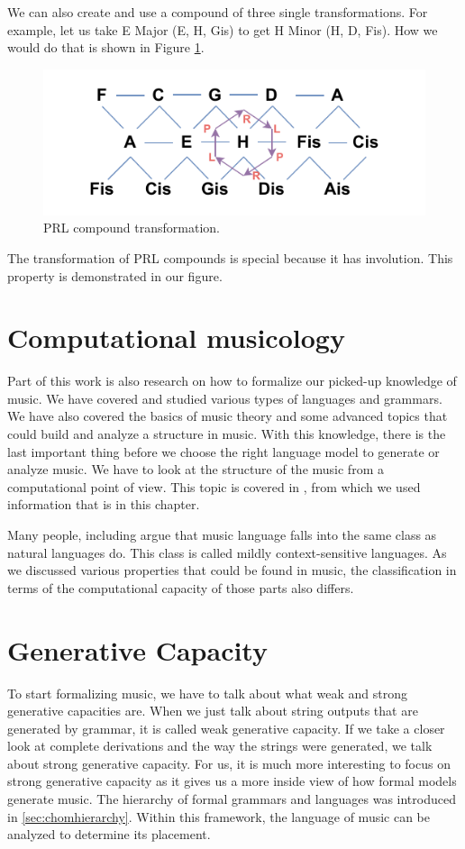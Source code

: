 We can also create and use a compound of three single transformations. For example, let us take E Major (E, H, Gis) to get H Minor (H, D, Fis). How we would do that is shown in Figure \ref{fig:tonnetzPRL}.

\begin{figure}[H]
    \centering
    \includegraphics[scale=0.9]{obrazky-figures/tonnetzPRL.pdf}
    \caption{PRL compound transformation.}
    \label{fig:tonnetzPRL}
\end{figure}

The transformation of PRL compounds is special because it has involution. This property is demonstrated in our figure.

\section{Computational musicology}
Part of this work is also research on how to formalize our picked-up knowledge of music. We have covered and studied various types of languages and grammars. We have also covered the basics of music theory and some advanced topics that could build and analyze a structure in music. With this knowledge, there is the last important thing before we choose the right language model to generate or analyze music. We have to look at the structure of the music from a computational point of view. This topic is covered in \cite{musicformallanguage}, from which we used information that is in this chapter.

Many people, including \cite{musicformallanguage} argue that music language falls into the same class as natural languages do. This class is called mildly context-sensitive languages. As we discussed various properties that could be found in music, the classification in terms of the computational capacity of those parts also differs.

\section{Generative Capacity}
To start formalizing music, we have to talk about what weak and strong generative capacities are. When we just talk about string outputs that are generated by grammar, it is called weak generative capacity. If we take a closer look at complete derivations and the way the strings were generated, we talk about strong generative capacity. For us, it is much more interesting to focus on strong generative capacity as it gives us a more inside view of how formal models generate music. The hierarchy of formal grammars and languages was introduced in \ref{sec:chomhierarchy}. Within this framework, the language of music can be analyzed to determine its placement.

